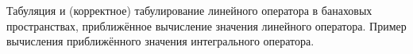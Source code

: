 \documentclass[__main__.tex]{subfiles}
\begin{document}
Табуляция и (корректное) табулирование линейного оператора в банаховых пространствах, приближённое вычисление значения линейного оператора. Пример вычисления приближённого значения интегрального оператора.
\end{document}
